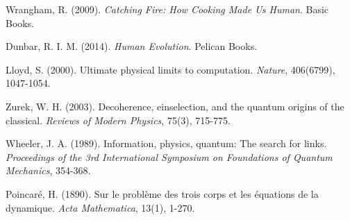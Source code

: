 \documentclass[11pt,twocolumn]{article}
\theoremstyle{remark}
\begin{document}
\begin{thebibliography}{99}
Wrangham, R. (2009). \textit{Catching Fire: How Cooking Made Us Human}. Basic Books.

Dunbar, R. I. M. (2014). \textit{Human Evolution}. Pelican Books.

Lloyd, S. (2000). Ultimate physical limits to computation. \textit{Nature}, 406(6799), 1047-1054.

Zurek, W. H. (2003). Decoherence, einselection, and the quantum origins of the classical. \textit{Reviews of Modern Physics}, 75(3), 715-775.

Wheeler, J. A. (1989). Information, physics, quantum: The search for links. \textit{Proceedings of the 3rd International Symposium on Foundations of Quantum Mechanics}, 354-368.

Poincaré, H. (1890). Sur le problème des trois corps et les équations de la dynamique. \textit{Acta Mathematica}, 13(1), 1-270.

\end{thebibliography}
\end{document}
